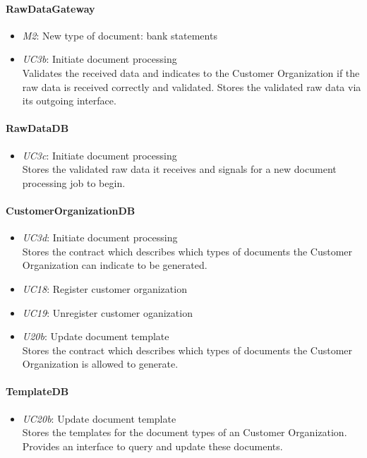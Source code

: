 \documentclass[a4paper,10pt]{article}
\begin{document}
\paragraph{RawDataGateway}
\begin{itemize}
	\item \emph{M2}: New type of document: bank statements
    \item \emph{UC3b}: Initiate document processing\\ Validates the received data and indicates to the Customer Organization if the raw data is received correctly and validated. Stores the validated raw data via its outgoing interface.
\end{itemize}

\paragraph{RawDataDB}
\begin{itemize}
	\item \emph{UC3c}: Initiate document processing\\ Stores the validated raw data it receives and signals for a new document processing job to begin. 
\end{itemize}
\paragraph{CustomerOrganizationDB}
\begin{itemize}
	\item \emph{UC3d}: Initiate document processing\\ Stores the contract which describes which types of documents the Customer Organization can indicate to be generated.
	\item \emph{UC18}: Register customer organization
    \item \emph{UC19}: Unregister customer oganization
    \item \emph{U20b}: Update document template\\ Stores the contract which describes which types of documents the Customer Organization is allowed to generate.
\end{itemize}
\paragraph{TemplateDB}
\begin{itemize}
		\item \emph{UC20b}: Update document template\\ Stores the templates for the document types of an Customer Organization. Provides an interface to query and update these documents.
\end{itemize}
\end{document}

